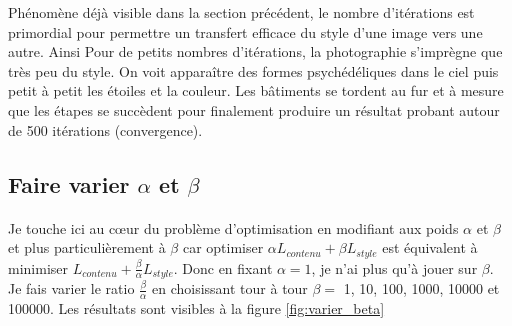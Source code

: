 \documentclass{article}
\begin{document}
Phénomène déjà visible dans la section précédent, le nombre d'itérations est primordial pour permettre un transfert efficace du style d'une image vers une autre. Ainsi Pour de petits nombres d'itérations, la photographie s'imprègne que très peu du style. On voit apparaître des formes psychédéliques dans le ciel puis petit à petit les étoiles et la couleur. Les bâtiments se tordent au fur et à mesure que les étapes se succèdent pour finalement produire un résultat probant autour de 500 itérations (convergence).

\subsection*{Faire varier $\alpha$ et $\beta$}
\paragraph*{}
Je touche ici au cœur du problème d'optimisation en modifiant aux poids $\alpha$ et $\beta$ et plus particulièrement à $\beta$ car optimiser $\alpha L_{contenu}+\beta L_{style}$ est équivalent à minimiser $L_{contenu}+ \frac{\beta}{\alpha} L_{style}$. Donc en fixant $\alpha=1$, je n'ai plus qu'à jouer sur $\beta$.\\
Je fais varier le ratio $\frac{\beta}{\alpha}$ en choisissant tour à tour $\beta =$ 1, 10, 100, 1000, 10000 et 100000. Les résultats sont visibles à la figure \ref{fig:varier_beta}
\end{document}
